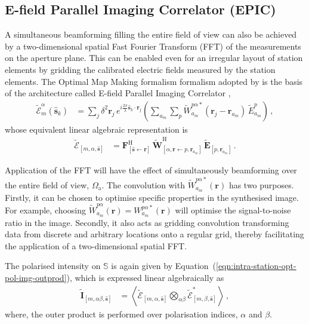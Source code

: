 \documentclass[
  journal=pasa,
  manuscript=article-type,
  year=2020,
  volume=37,
]{cup-journal}
\begin{document}
\subsection{E-field Parallel Imaging Correlator (EPIC)}

A simultaneous beamforming filling the entire field of view can also be achieved by a two-dimensional spatial Fast Fourier Transform (FFT) of the measurements on the aperture plane. This can be enabled even for an irregular layout of station elements by gridding the calibrated electric fields measured by the station elements. The Optimal Map Making formalism \citep[OMM;][]{Tegmark1997a} formalism adopted by \citet{Morales2011} is the basis of the architecture called E-field Parallel Imaging Correlator \cite[EPIC;][]{Thyagarajan+2017},
\begin{align}
    \widetilde{\mathcal{E}}_m^\alpha(\hat{\boldsymbol{s}}_k) &= \sum_j \delta^2 \boldsymbol{r}_j \, e^{i\frac{2\pi}{\lambda} \hat{\boldsymbol{s}}_k\cdot\boldsymbol{r}_j} \left(\sum_{a_m} \sum_p \widetilde{W}_{a_m}^{p\alpha*}(\boldsymbol{r}_j-\boldsymbol{r}_{a_m}) \, \widetilde{E}_{a_m}^p \right) \, , \label{eqn:intra-station-pol-hol-img-epic}
\end{align}
whose equivalent linear algebraic representation is 
\begin{align}
    \widetilde{\boldsymbol{\mathcal{E}}}_{[m,\alpha,\hat{\boldsymbol{s}}]} &= \mathbf{F}^\textrm{H}_{[\hat{\boldsymbol{s}}\leftarrow \boldsymbol{r}]}\,\widetilde{\mathbf{W}}^\textrm{H}_{[\alpha,\boldsymbol{r}\leftarrow p,\boldsymbol{r}_{a_m}]}\,\widetilde{\mathbf{E}}_{[p,\boldsymbol{r}_{a_m}]} \, . \label{eqn:intra-station-pol-hol-img-epic-LA}
\end{align}

Application of the FFT will have the effect of simultaneously beamforming over the entire field of view, $\Omega_\textrm{a}$. The convolution with $\widetilde{W}_{a_m}^{p\alpha*}(\boldsymbol{r})$ has two purposes. Firstly, it can be chosen to optimise specific properties in the synthesised image. For example, choosing $\widetilde{W}_{a_m}^{p\alpha}(\boldsymbol{r})=W_{a_m}^{p\alpha*}(\boldsymbol{r})$ will optimise the signal-to-noise ratio in the image. Secondly, it also acts as gridding convolution transforming data from discrete and arbitrary locations onto a regular grid, thereby facilitating the application of a two-dimensional spatial FFT. 

The polarised intensity on $\mathbb{S}$ is again given by Equation~(\ref{eqn:intra-station-opt-pol-img-outprod}), which is expressed linear algebraically as
\begin{align}
    \widetilde{\mathbf{I}}_{[m,\alpha\beta,\hat{\boldsymbol{s}}]} &= \left\langle \widetilde{\boldsymbol{\mathcal{E}}}_{[m,\alpha,\hat{\boldsymbol{s}}]} \bigotimes_{\alpha\beta} \widetilde{\boldsymbol{\mathcal{E}}}_{[m,\beta,\hat{\boldsymbol{s}}]}^* \right\rangle \, , \label{eqn:intra-station-opt-polarimetric-direct-img-LA}    
\end{align}
where, the outer product is performed over polarisation indices, $\alpha$ and $\beta$. 
\end{document}
